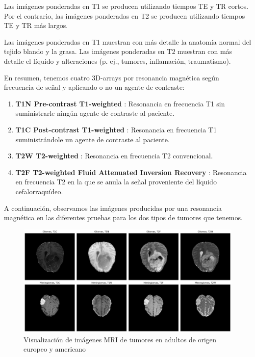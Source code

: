 Las imágenes ponderadas en T1 se producen utilizando tiempos TE y TR cortos. Por el contrario, las imágenes ponderadas en T2 se producen utilizando tiempos TE y TR más largos.

Las imágenes ponderadas en T1 muestran con más detalle la anatomía normal del tejido blando y la grasa. Las imágenes ponderadas en T2 muestran con más detalle el líquido y alteraciones (p. ej., tumores, inflamación, traumatismo). 

En resumen, tenemos cuatro 3D-arrays por resonancia magnética según frecuencia de señal y aplicando o no un agente de contraste:

\begin{enumerate}
	\item \textbf{T1N Pre-contrast T1-weighted} :  Resonancia en frecuencia T1 sin suministrarle ningún agente de contraste al paciente.
	\item \textbf{T1C Post-contrast T1-weighted} : Resonancia en frecuencia T1 suministrándole un agente de contraste al paciente.
	\item \textbf{T2W T2-weighted} : Resonancia en frecuencia T2 convencional.
	\item \textbf{T2F T2-weighted Fluid Attenuated Inversion Recovery} : Resonancia en frecuencia T2 en la que se anula la señal proveniente del líquido cefalorraquídeo.
\end{enumerate}

A continuación, observamos las imágenes producidas por una resonancia magnética en las diferentes pruebas para los dos tipos de tumores que tenemos.

\begin{figure}[!h]
	\centering
	\includegraphics[width=1.1\linewidth]{imagenes/introduccion_imagenesMRI.png}
	\caption{Visualización de imágenes MRI de tumores en adultos de origen europeo y americano}
\end{figure}


